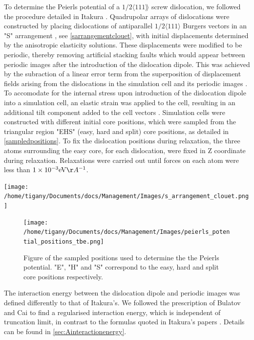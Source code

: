 \documentclass[a4paper,11pt]{article}
\begin{document}
To determine the Peierls potential of a \(1/2\langle 111 \rang\) screw dislocation, we followed the procedure detailed in Itakura
\cite{Itakura2012}. Quadrupolar arrays of dislocations were constructed by placing dislocations of
antiparallel \(1/2\langle 111\rangle\) Burgers vectors in an "S" arrangement \cite{Clouet2012}, see
\ref{sarrangementclouet}, with initial displacements determined by the anisotropic elasticity
solutions. These displacements were modified to be periodic, thereby removing artificial stacking
faults which would appear between periodic images after the introduction of the dislocation
dipole. This was achieved by the subraction of a linear error term from the superposition of
displacement fields arising from the dislocations in the simulation cell and its periodic images
\cite{vasilybulatov2006}. To accomodate for the internal stress upon introduction of the
dislocation dipole into a simulation cell, an elastic strain was applied to the cell, resulting
in an additional tilt component added to the cell vectors
\cite{Clouet2012,vasilybulatov2006}. Simulation cells were constructed with different initial core
positions, which were sampled from the triangular region "EHS" (easy, hard and split) core
positions, as detailed in \ref{sampledpositions}. To fix the dislocation positions during relaxation,
the three atoms surrounding the easy core, for each dislocation, were fixed in Z coordinate
during relaxation. Relaxations were carried out until forces on each atom were less than \(1\times10^{-3 }\text{eV}\AA^{-1}\).


\begin{center}
\texttt{[image: /home/tigany/Documents/docs/Management/Images/s\_arrangement\_clouet.png]}
\end{center}

\begin{figure}[htbp]
\centering
\texttt{[image: /home/tigany/Documents/docs/Management/Images/peierls\_potential\_positions\_tbe.png]}
\caption{\label{fig:orgd36efd5}
Figure of the sampled positions used to determine the the Peierls potential. "E", "H" and "S" correspond to the easy, hard and split core positions respectively.}
\end{figure}


The interaction energy between the dislocation dipole and periodic images was defined differently
to that of Itakura's. We followed the prescription of Bulatov and Cai \cite{vasilybulatov2006} to
find a regularised interaction energy, which is independent of truncation limit, in contrast to
the formulas quoted in Itakura's papers \cite{Itakura2012}. Details can be found in \ref{sec:Ainteractionenergy}.
\end{document}
